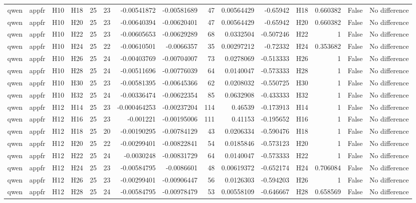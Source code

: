 \begin{longtable}{llllrrrrrrrlrrl}
qwen & appfr & H10 & H18 & 25 & 23 & -0.00541872 & -0.00581689 & 47 & 0.00564429 & -0.65942 & H18 & 0.660382 & False & No difference \\
qwen & appfr & H10 & H20 & 25 & 23 & -0.00640394 & -0.00620401 & 47 & 0.00564429 & -0.65942 & H20 & 0.660382 & False & No difference \\
qwen & appfr & H10 & H22 & 25 & 23 & -0.00605653 & -0.00629289 & 68 & 0.0332504 & -0.507246 & H22 & 1 & False & No difference \\
qwen & appfr & H10 & H24 & 25 & 22 & -0.00610501 & -0.0066357 & 35 & 0.00297212 & -0.72332 & H24 & 0.353682 & False & No difference \\
qwen & appfr & H10 & H26 & 25 & 24 & -0.00403769 & -0.00704007 & 73 & 0.0278069 & -0.513333 & H26 & 1 & False & No difference \\
qwen & appfr & H10 & H28 & 25 & 24 & -0.00511696 & -0.00776039 & 64 & 0.0140047 & -0.573333 & H28 & 1 & False & No difference \\
qwen & appfr & H10 & H30 & 25 & 23 & -0.00581395 & -0.00645366 & 62 & 0.0208032 & -0.550725 & H30 & 1 & False & No difference \\
qwen & appfr & H10 & H32 & 25 & 24 & -0.00336474 & -0.00622354 & 85 & 0.0632908 & -0.433333 & H32 & 1 & False & No difference \\
qwen & appfr & H12 & H14 & 25 & 23 & -0.000464253 & -0.00237204 & 114 & 0.46539 & -0.173913 & H14 & 1 & False & No difference \\
qwen & appfr & H12 & H16 & 25 & 23 & -0.001221 & -0.00195006 & 111 & 0.41153 & -0.195652 & H16 & 1 & False & No difference \\
qwen & appfr & H12 & H18 & 25 & 20 & -0.00190295 & -0.00784129 & 43 & 0.0206334 & -0.590476 & H18 & 1 & False & No difference \\
qwen & appfr & H12 & H20 & 25 & 22 & -0.00299401 & -0.00822841 & 54 & 0.0185846 & -0.573123 & H20 & 1 & False & No difference \\
qwen & appfr & H12 & H22 & 25 & 24 & -0.0030248 & -0.00831729 & 64 & 0.0140047 & -0.573333 & H22 & 1 & False & No difference \\
qwen & appfr & H12 & H24 & 25 & 23 & -0.00584795 & -0.0086601 & 48 & 0.00619372 & -0.652174 & H24 & 0.706084 & False & No difference \\
qwen & appfr & H12 & H26 & 25 & 23 & -0.00299401 & -0.00906447 & 56 & 0.0126303 & -0.594203 & H26 & 1 & False & No difference \\
qwen & appfr & H12 & H28 & 25 & 24 & -0.00584795 & -0.00978479 & 53 & 0.00558109 & -0.646667 & H28 & 0.658569 & False & No difference \\

\end{longtable}
